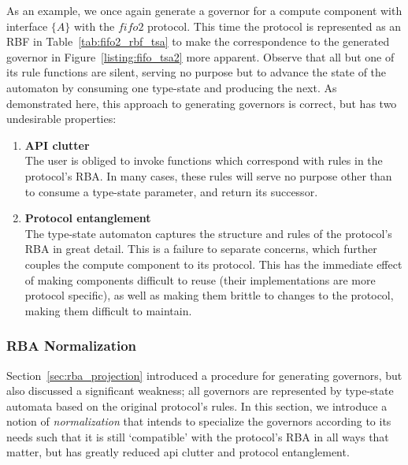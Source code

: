As an example, we once again generate a governor for a compute component with interface $\{A\}$ with the $fifo2$ protocol. This time the protocol is represented as an RBF in Table~\ref{tab:fifo2_rbf_tsa} to make the correspondence to the generated governor in Figure~\ref{listing:fifo_tsa2} more apparent. Observe that all but one of its rule functions are silent, serving no purpose but to advance the state of the automaton by consuming one type-state and producing the next. As demonstrated here, this approach to generating governors is correct, but has two undesirable properties:
\begin{enumerate}
	\item \textbf{API clutter}\\
	The user is obliged to invoke functions which correspond with rules in the protocol's RBA. In many cases, these rules will serve no purpose other than to consume a type-state parameter, and return its successor. 
	
	\item \textbf{Protocol entanglement}\\
	The type-state automaton captures the structure and rules of the protocol's RBA in great detail. This is a failure to separate concerns, which further couples the compute component to its protocol. This has the immediate effect of making components difficult to reuse (their implementations are more protocol specific), as well as making them brittle to changes to the protocol, making them difficult to maintain. 
	
\end{enumerate}

\subsubsection{RBA Normalization}
\label{sec:rba_normalization}
Section~\ref{sec:rba_projection} introduced a procedure for generating governors, but also discussed a significant weakness; all governors are represented by type-state automata based on the original protocol's rules. In this section, we introduce a notion of \textit{normalization} that intends to specialize the governors according to its needs such that it is still `compatible' with the protocol's RBA in all ways that matter, but has greatly reduced api clutter and protocol entanglement. 

